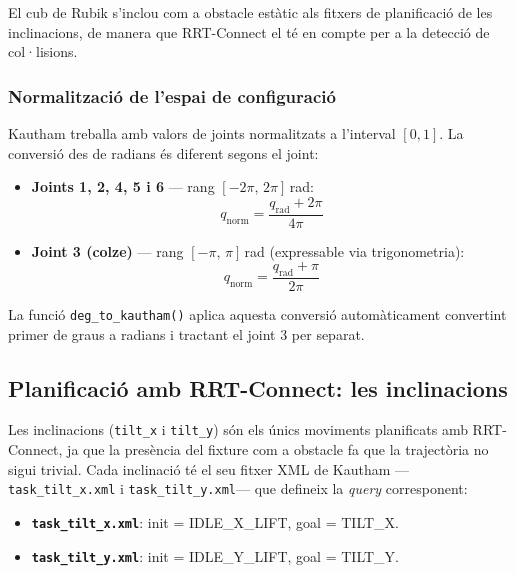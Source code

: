\documentclass[12pt, a4paper]{article}
\begin{document}
El cub de Rubik s'inclou com a obstacle estàtic als fitxers de planificació de les inclinacions, de manera que RRT-Connect el té en compte per a la detecció de col·lisions.

\subsubsection{Normalització de l'espai de configuració}

Kautham treballa amb valors de joints normalitzats a l'interval $[0, 1]$. La conversió des de radians és diferent segons el joint:

\begin{itemize}
  \item \textbf{Joints 1, 2, 4, 5 i 6} — rang $[-2\pi,\, 2\pi]$\,rad:
  \begin{equation*}
    q_{\text{norm}} = \frac{q_{\text{rad}} + 2\pi}{4\pi}
  \end{equation*}
  \item \textbf{Joint 3 (colze)} — rang $[-\pi,\, \pi]$\,rad (expressable via trigonometria):
  \begin{equation*}
    q_{\text{norm}} = \frac{q_{\text{rad}} + \pi}{2\pi}
  \end{equation*}
\end{itemize}

La funció \texttt{deg\_to\_kautham()} aplica aquesta conversió automàticament convertint primer de graus a radians i tractant el joint 3 per separat.

\subsection{Planificació amb RRT-Connect: les inclinacions}

Les inclinacions (\texttt{tilt\_x} i \texttt{tilt\_y}) són els únics moviments planificats amb RRT-Connect, ja que la presència del fixture com a obstacle fa que la trajectòria no sigui trivial. Cada inclinació té el seu fitxer XML de Kautham —\texttt{task\_tilt\_x.xml} i \texttt{task\_tilt\_y.xml}— que defineix la \textit{query} corresponent:

\begin{itemize}
  \item \textbf{\texttt{task\_tilt\_x.xml}}: init = IDLE\_X\_LIFT, goal = TILT\_X.
  \item \textbf{\texttt{task\_tilt\_y.xml}}: init = IDLE\_Y\_LIFT, goal = TILT\_Y.
\end{itemize}
\end{document}
